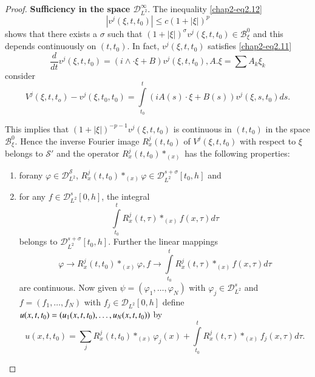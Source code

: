 \begin{proof}
\textbf{Sufficiency in the space $\mathscr{D}^\infty _{L^2}$}. The
 inequality \eqref{chap2-eq2.12} 
$$
|v^j (\xi, t,  t_0) | \leq c(1+| \xi |)^p 
$$
shows that there exists a $\sigma$ such that $ (1+ | \xi |)^\sigma
v^j (\xi, t, t_0) \in \mathscr{B}^{0}_{\xi} $ and this depends
continuously on $(t,t_0)$. In fact, $ v^j (\xi,  t,  t_0)$
satisfies  \eqref{chap2-eq2.11}
\begin{equation*}
\frac{d}{dt} v^j (\xi,  t,  t_0) = (i \wedge \cdot \xi + B) v^j (\xi,
t,  t_0),  A. \xi = \sum A_k \xi _k   
\end{equation*}
consider
$$
V^j (\xi, t, t_o) -v^j (\xi,  t_0,  t_0) = \int\limits^t_{t_0} (iA
(s) \cdot \xi + B (s)) v^j (\xi,  s, t_0)ds.  
$$

This implies that $(1+ |\xi |)^{-p-1} v^j (\xi, t, t_0)$ is
continuous in $(t, t_0) $ in the space $\mathscr{B}^0_\xi
$. Hence the inverse Fourier image $R^j _x (t,  t_0)$ of $ V^j (\xi,
t, t_0)$ with respect to $\xi$ belongs to $ \mathscr{S'}$ and the
operator $ R^j_x(t, t_0) *_{(x)}$ has the following properties: 
\begin{enumerate}[(1)]
\item  for\pageoriginale any $ \varphi \in \mathscr{D}_{L^2}^\mathscr{S}$, $
  R^j_x(t, t_0) * _{(x)} \varphi \in \mathscr{D}_{L^2}^{s+ \sigma}
  [t_0,  h]$ and  

\item for any $ f \in \mathscr{D}_{L^2}^s [0, h]$, the integral
$$
 \int \limits^t_{t_0} R^j_x(t, \tau) *_{(x)}f(x,  \tau)d \tau 
 $$
belongs to $\mathscr{D}_{L^2}^{s+ \sigma} [t_0,  h]$. Further the
linear mappings  
 \begin{equation}
\varphi \to R^j_x(t, t_0) * _{(x)} \varphi ,  f \to \int
\limits^t_{t_0} R^j_x(t, \tau) * _{(x)}f(x,  \tau )d \tau
\tag{2.17}\label{chap2-eq2.17}    
 \end{equation} 
are continuous. Now given $ \psi = (\varphi _1,  \ldots,  \varphi_N)$
with $ \varphi_j \in \mathscr{D}_{L^2}^s$ and\break $f= (f_1,  \ldots ,
f_N)$ with $ f_j \in \mathscr{D}_{L^2} [0,  h]$ define $ u(x,  t,
t_0) = (u_1 (x, t, t_0),\break  \ldots,  u_N(x, t, t_0))$ by  
\begin{equation}
u(x, t, t_0) = \sum\limits_j R^j_x (t,  t_0) *_{(x)} \varphi_j (x)
+\int 
\limits^t_{t_0} R^j_x(t, \tau) *_{(x)}f_j(x,  \tau )d \tau .
\tag{2.18}\label{chap2-eq2.18}   
\end{equation}
\end{enumerate}


\end{proof}
